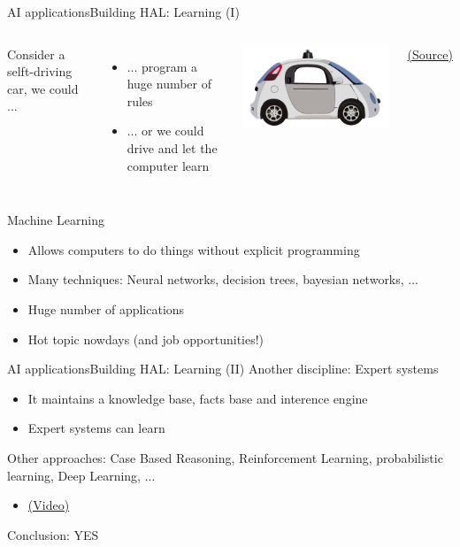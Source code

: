 \documentclass[10pt,compress]{beamer} %
\begin{document}
\begin{frame}{AI applications}{Building HAL: Learning (I)}
	\begin{columns}
			Consider a selft-driving car, we could ...
			\begin{itemize}
				\item ... program a huge number of rules
				\item ... or we could drive and let the computer learn
			\end{itemize}
			\includegraphics[width=\linewidth]{figs/car.png}\\
			\vspace{-0.2cm}
			\begin{center}
			\tiny{\href{http://www.national.co.uk/tech-powers-google-car/}{(Source)}}
			\end{center}
	\end{columns}

	Machine Learning
	\begin{itemize}
		\item Allows computers to do things without explicit programming
		\item Many techniques: Neural networks, decision trees, bayesian networks, ...
		\item Huge number of applications
		\item Hot topic nowdays (and job opportunities!)
	\end{itemize}
	
\end{frame}

\begin{frame}{AI applications}{Building HAL: Learning (II)}
	Another discipline: Expert systems
	\begin{itemize}
		\item It maintains a knowledge base, facts base and interence engine
		\item Expert systems can learn
	\end{itemize}
	Other approaches: Case Based Reasoning, Reinforcement Learning, probabilistic learning, Deep Learning, ...
	\begin{itemize}
		\item \href{https://www.youtube.com/watch?v=W_gxLKSsSIE}{(Video)}
	\end{itemize}
	Conclusion: YES
\end{frame}
\end{document}
